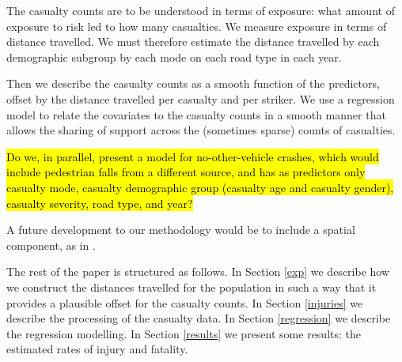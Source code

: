 \documentclass{article}
\begin{document}
The casualty counts are to be understood in terms of exposure: what amount of exposure to risk led to how many casualties. We measure exposure in terms of distance travelled. We must therefore estimate the distance travelled by each demographic subgroup by each mode on each road type in each year. %

Then we describe the casualty counts as a smooth function of the predictors, offset by the distance travelled per casualty and per striker. We use a regression model to relate the covariates to the casualty counts in a smooth manner that allows the sharing of support across the (sometimes sparse) counts of casualties. 

\hl{Do we, in parallel, present a model for no-other-vehicle crashes, which would include pedestrian falls from a different source, and has as predictors only casualty mode, casualty demographic group (casualty age and casualty gender), casualty severity, road type, and year?} \citep{Methorst2017,Ward2005}

A future development to our methodology would be to include a spatial component, as in \citet{Boulieri2016}. 

The rest of the paper is structured as follows. In Section \ref{exp} we describe how we construct the distances travelled for the population in such a way that it provides a plausible offset for the casualty counts. In Section \ref{injuries} we describe the processing of the casualty data. In Section \ref{regression} we describe the regression modelling. In Section \ref{results} we present some results: the estimated rates of injury and fatality.
\end{document}
